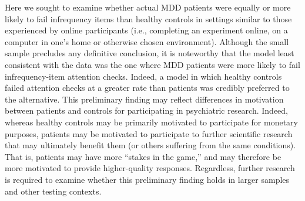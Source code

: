 \documentclass[a4paper,notitlepage,12pt]{article}
\begin{document}
Here we sought to examine whether actual MDD patients were equally or more likely to fail infrequency items than healthy controls in settings similar to those experienced by online participants (i.e., completing an experiment online, on a computer in one's home or otherwise chosen environment). Although the small sample precludes any definitive conclusion, it is noteworthy that the model least consistent with the data was the one where MDD patients were more likely to fail infrequency-item attention checks. Indeed, a model in which healthy controls failed attention checks at a greater rate than patients was credibly preferred to the alternative. This preliminary finding may reflect differences in motivation between patients and controls for participating in psychiatric research. Indeed, whereas healthy controls may be primarily motivated to participate for monetary purposes, patients may be motivated to participate to further scientific research that may ultimately benefit them (or others suffering from the same conditions). That is, patients may have more ``stakes in the game,'' and may therefore be more motivated to provide higher-quality responses. Regardless, further research is required to examine whether this preliminary finding holds in larger samples and other testing contexts. 

\printbibliography[title=Supplementary References]
\end{document}
